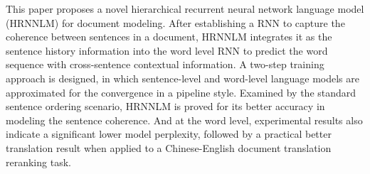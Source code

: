 This paper proposes a novel hierarchical recurrent neural network language model (HRNNLM) for document modeling. After establishing a RNN to capture the coherence between sentences in a document, HRNNLM integrates it as the sentence history information into the word level RNN to predict the word sequence with cross-sentence contextual information. A two-step training approach is designed, in which sentence-level and word-level language models are approximated for the convergence in a pipeline style. Examined by the standard sentence ordering scenario, HRNNLM is proved for its better accuracy in modeling the sentence coherence. And at the word level, experimental results also indicate a significant lower model perplexity, followed by a practical better translation result when applied to a Chinese-English document translation reranking task.
